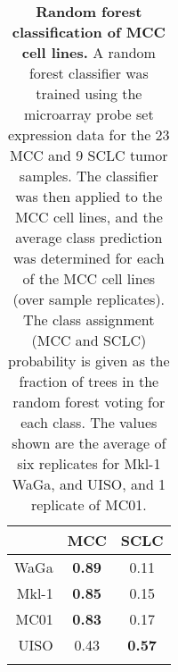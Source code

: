 \documentclass[10pt]{article}
\begin{document}
\clearpage



    
    
  

\clearpage

\begin{table}[H]

  \begin{center}
    
    \caption{
      \textbf{Random forest classification of MCC cell lines.}
      A random forest classifier was trained using the microarray probe set expression data for the 23 MCC and 9 SCLC tumor samples.
      The classifier was then applied to the MCC cell lines, and the average class prediction was determined for each of the MCC cell lines (over sample replicates).
      The class assignment (MCC and SCLC) probability is given as the fraction of trees in the random forest voting for each class.
      The values shown are the average of six replicates for Mkl-1 WaGa, and UISO, and 1 replicate of MC01.
    }
    
    \begin{tabular}{rcc}
      \hline 
      & MCC  & SCLC \tabularnewline
      \hline 
      WaGa & \textbf{0.89} & 0.11\tabularnewline
      Mkl-1 & \textbf{0.85} & 0.15\tabularnewline
      MC01 & \textbf{0.83} & 0.17\tabularnewline
      UISO & 0.43 & \textbf{0.57}\tabularnewline
      \hline 
      \label{tab:classifier}

    \end{tabular}
    
  \end{center}
  
\end{table}
\end{document}
